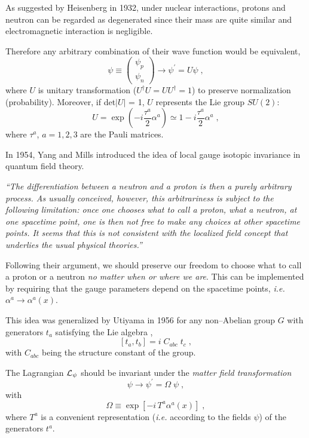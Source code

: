 \documentclass[12pt]{report}
\newcommand{\lag}{{\cal L}}
\newcommand{\ba}{\begin{array}}
\newcommand{\ea}{\end{array}}
\begin{document}
As suggested by Heisenberg \cite{Heisenberg:32} in 1932, under
nuclear interactions, protons and neutron can be regarded as
degenerated since their mass are quite similar and electromagnetic
interaction is negligible. 

Therefore any arbitrary combination of their wave function would be
equivalent,
\[
\psi \equiv      \left( \ba{c}
                        \psi_p\\
                        \psi_n
              \ea \right) \to \psi^\prime = U \psi \; ,
\]
where $U$ is unitary transformation ($U^\dagger U = U U^\dagger =1$)
to preserve normalization (probability). Moreover, if det$|U|$ = 1,
$U$ represents the Lie group $SU(2)$:
\[
U = \exp\left(-i \frac{\tau^a}{2} \alpha^a \right) 
\simeq 1 - i  \frac{\tau^a}{2} \alpha^a \; ,
\]
where $\tau^a$, $a = 1,2,3$ are the Pauli matrices.

In 1954, Yang and Mills \cite{Yang:54} introduced the idea of local
gauge isotopic invariance in quantum field theory. 
\begin{center}
\begin{minipage}[h]{12cm}
{\it  ``The differentiation between a neutron and a proton
is then a purely arbitrary process. As usually conceived, however,
this arbitrariness is subject to the following limitation: once
one chooses what to call a proton, what a neutron, at one
spacetime point, one is then not free to make any choices at
other spacetime points. It seems that this is not consistent
with the localized field concept that underlies the usual
physical theories.''}
\end{minipage}
\end{center}

Following their argument, we should preserve our freedom to choose
what to call a proton or a neutron {\it no matter when or where we
are}. This can be implemented by requiring that the gauge parameters 
depend on the spacetime points, {\it i.e.} $\alpha^a \to \alpha^a
(x)$.

This idea was generalized by Utiyama \cite{Utiyama:56} in 1956 for
any non--Abelian group $G$ with generators $t_a$ satisfying the Lie
algebra \cite{Abers:73},
\[
\left[ t_a, t_b \right] = i \; C_{abc} \; t_c \; ,
\]
with $C_{abc}$ being the structure constant of the group.

The Lagrangian $\lag_\psi$ should be invariant under the {\it matter
field transformation}
\[
\psi \to \psi^\prime  = \Omega \; \psi \; ,
\]
with 
\[ 
\Omega \equiv \exp\left[-i \, T^a \alpha^a(x)\right] \; ,
\]
where $T^a$ is a convenient representation ({\it i.e.} according to 
the fields $\psi$) of the generators $t^a$.
\end{document}
